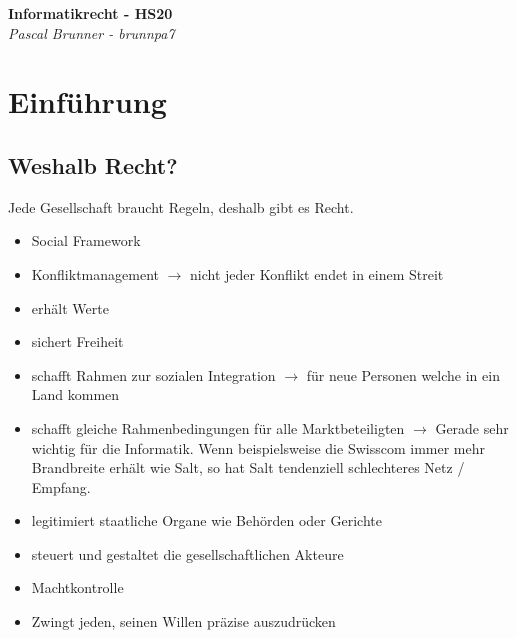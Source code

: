 \documentclass{report}
\newenvironment{Figure}
	{\par\medskip\noindent\minipage{\linewidth}}
	{\endminipage\par\medskip}
\theoremstyle{definition}
\theoremstyle{example}
\begin{document}
\begin{titlepage}
   \begin{center}
      \Large\textbf{Informatikrecht - HS20}\\
      \large\textit{Pascal Brunner - brunnpa7}
   \end{center}
\end{titlepage}


\tableofcontents

\newpage

\chapter{Einführung}

\section{Weshalb Recht?}
Jede Gesellschaft braucht Regeln, deshalb gibt es Recht.
\begin{itemize}
   \item Social Framework
   \item Konfliktmanagement $\rightarrow$ nicht jeder Konflikt endet in einem Streit
   \item erhält Werte 
   \item sichert Freiheit  
   \item schafft Rahmen zur sozialen Integration $\rightarrow$ für neue Personen welche in ein Land kommen
   \item schafft gleiche Rahmenbedingungen für alle Marktbeteiligten $\rightarrow$ Gerade sehr wichtig für die Informatik. Wenn beispielsweise die Swisscom immer mehr Brandbreite erhält wie Salt, so hat Salt tendenziell schlechteres Netz / Empfang.
   \item legitimiert staatliche Organe wie Behörden oder Gerichte 
   \item steuert und gestaltet die gesellschaftlichen Akteure
   \item Machtkontrolle
   \item Zwingt jeden, seinen Willen präzise auszudrücken
\end{itemize}
\end{document}
